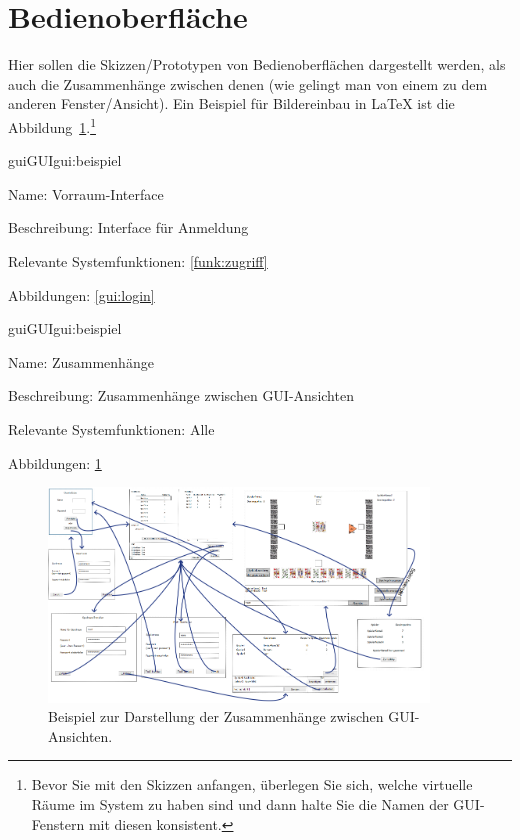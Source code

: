 
\section{Bedienoberfläche}

Hier sollen die Skizzen/Prototypen von Bedienoberflächen dargestellt werden, als auch die Zusammenhänge zwischen denen (wie gelingt man von einem zu dem anderen Fenster/Ansicht). Ein Beispiel für Bildereinbau in LaTeX ist die Abbildung~\ref{gui:zusammenhang}.\footnote{Bevor Sie mit den Skizzen anfangen, überlegen Sie sich, welche virtuelle Räume im System zu haben sind und dann halte Sie die Namen der GUI-Fenstern mit diesen konsistent.}

\setcounter{gui}{10}

\begin{description}[leftmargin=5em, style=sameline]	
	\begin{lhp}{gui}{GUI}{gui:beispiel}
		\item[Name:] Vorraum-Interface
		\item[Beschreibung:] Interface für Anmeldung
		\item[Relevante Systemfunktionen:] \ref{funk:zugriff}
		\item[Abbildungen:] \ref{gui:login}
	\end{lhp}
\end{description}

\begin{description}[leftmargin=5em, style=sameline]	
	\begin{lhp}{gui}{GUI}{gui:beispiel}
		\item[Name:] Zusammenhänge
		\item[Beschreibung:] Zusammenhänge zwischen GUI-Ansichten
		\item[Relevante Systemfunktionen:] Alle
		\item[Abbildungen:] \ref{gui:zusammenhang}
	\end{lhp}
\end{description}

\begin{figure}
	\centering
	\includegraphics[width=0.9\textwidth]{img/gui-zusammenhang}
	\caption{Beispiel zur Darstellung der Zusammenhänge zwischen GUI-Ansichten.}
	\label{gui:zusammenhang}
\end{figure}


